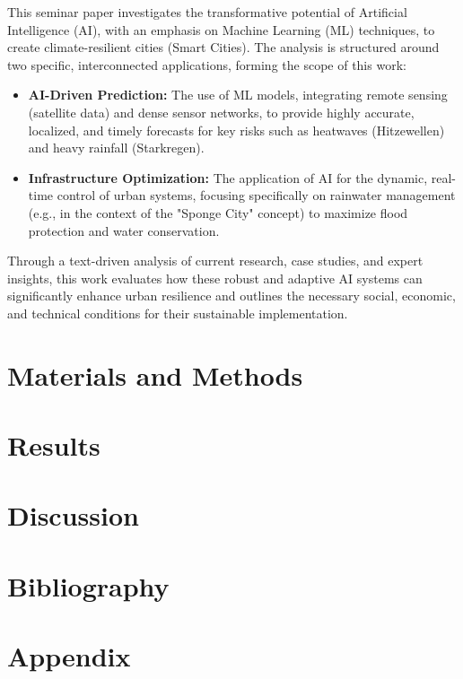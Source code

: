 \documentclass[12pt]{article}
\begin{document}
This seminar paper investigates the transformative potential of Artificial Intelligence (AI), with an 
emphasis on Machine Learning (ML) techniques, to create climate-resilient cities (Smart Cities). The analysis is 
structured around two specific, interconnected applications, forming the scope of this work:
\begin{itemize}
    \item \textbf{AI-Driven Prediction:} The use of ML models, integrating remote sensing (satellite data) and dense sensor networks,
to provide highly accurate, localized, and timely forecasts for key risks such as heatwaves (Hitzewellen) and heavy 
rainfall (Starkregen).

    \item \textbf{Infrastructure Optimization:} The application of AI for the dynamic, real-time control of urban systems, focusing
specifically on rainwater management (e.g., in the context of the "Sponge City" concept) to maximize flood protection
and water conservation.
\end{itemize} 
Through a text-driven analysis of current research, case studies, and expert insights, this work evaluates how these 
robust and adaptive AI systems can significantly enhance urban resilience and outlines the necessary social, economic, 
and technical conditions for their sustainable implementation.
\section{Materials and Methods}
\lipsum[4-5]\cite{ref01}  %

\section{Results}
\lipsum[6-7]\cite{ref02}  %

\section{Discussion}
\lipsum[8-9]\cite{ref03}  %

\section{Bibliography}
\printbibliography[heading=none]


\section{Appendix}
\lipsum[10]
\end{document}
